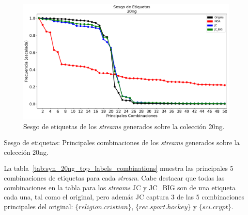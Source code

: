 \begin{figure}[htbp]
	\includegraphics[width=\linewidth]{figures/experiments/syn/20ng/label_skew.png}
	\caption{Sesgo de etiquetas de los \textit{streams} generados sobre la colección
		20ng.}
	\label{fig:syn_20ng_label_skew}
\end{figure}

\begin{table}[htbp]
	\centering
	\begin{adjustbox}{max width=\textwidth}
		
	\end{adjustbox}
	\caption{Sesgo de etiquetas: Principales combinaciones de los
		\textit{streams} generados sobre la colección 20ng.}
	\label{tab:syn_20ng_top_labels_combinations}
\end{table}

La tabla~\ref{tab:syn_20ng_top_labels_combinations} muestra las principales 5
combinaciones de etiquetas para cada \textit{stream}. Cabe destacar que todas
las combinaciones en la tabla para los \textit{streams} JC y JC\_BIG son de una
etiqueta cada una, tal como el original, pero además JC captura 3 de las 5
combinaciones principales del original: $\{religion.cristian\}$,
$\{rec.sport.hockey\}$ y $\{sci.crypt\}$.

